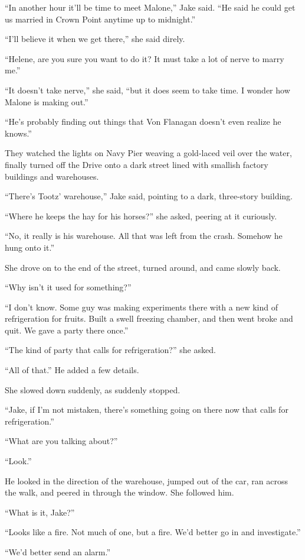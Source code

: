 \documentclass{novel}
\begin{document}
“In another hour it’ll be time to meet Malone,” Jake said. “He said he could get us married in Crown Point anytime up to midnight.”

“I’ll believe it when we get there,” she said direly.

“Helene, are you sure you want to do it? It must take a lot of nerve to marry me.”

“It doesn’t take nerve,” she said, “but it does seem to take time. I wonder how Malone is making out.”

“He’s probably finding out things that Von Flanagan doesn’t even realize he knows.”

They watched the lights on Navy Pier weaving a gold-laced veil over the water, finally turned off the Drive onto a dark street lined with smallish factory buildings and warehouses.

“There’s Tootz’ warehouse,” Jake said, pointing to a dark, three-story building.

“Where he keeps the hay for his horses?” she asked, peering at it curiously.

“No, it really is his warehouse. All that was left from the crash. Somehow he hung onto it.”

She drove on to the end of the street, turned around, and came slowly back.

“Why isn’t it used for something?”

“I don’t know. Some guy was making experiments there with a new kind of refrigeration for fruits. Built a swell freezing chamber, and then went broke and quit. We gave a party there once.”

“The kind of party that calls for refrigeration?” she asked.

“All of that.” He added a few details.

She slowed down suddenly, as suddenly stopped.

“Jake, if I’m not mistaken, there’s something going on there now that calls for refrigeration.”

“What are you talking about?”

“Look.”

He looked in the direction of the warehouse, jumped out of the car, ran across the walk, and peered in through the window. She followed him.

“What is it, Jake?”

“Looks like a fire. Not much of one, but a fire. We’d better go in and investigate.”

“We’d better send an alarm.”
\end{document}
